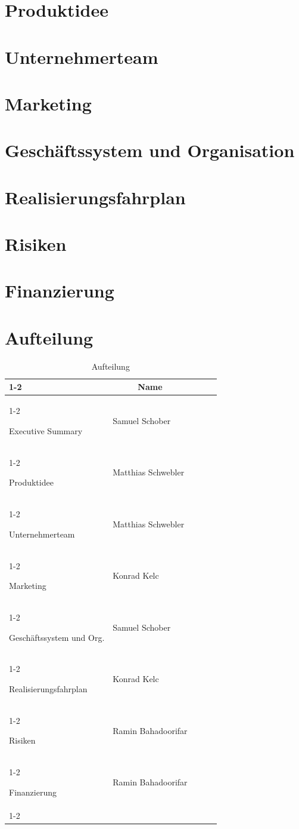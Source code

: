 \documentclass[11pt]{article}
\begin{document}
\section{Produktidee}
\section{Unternehmerteam}
\section{Marketing}
\section{Gesch\"aftssystem und Organisation}
\section{Realisierungsfahrplan}
\section{Risiken}
\section{Finanzierung}

\newpage
\section{Aufteilung}
\begin{table}[ht]
	\centering
	\begin{tabular}{|l|l|lll}
		\cline{1-2}
		\multicolumn{1}{|c|}{\textbf{\rule{0pt}{3ex} Thema}} & \multicolumn{1}{c|}{\textbf{Name}} &  &  &  \\ \cline{1-2}
		
		\rule{0pt}{3ex} Executive Summary                    & Samuel Schober                     &  &  &  \\ \cline{1-2}
		\rule{0pt}{3ex} Produktidee                          & Matthias Schwebler                 &  &  &  \\ \cline{1-2}
		\rule{0pt}{3ex} Unternehmerteam                      & Matthias Schwebler                 &  &  &  \\ \cline{1-2}
		\rule{0pt}{3ex} Marketing                            & Konrad Kelc                        &  &  &  \\ \cline{1-2}
		\rule{0pt}{3ex} Geschäftssystem und Org.             & Samuel Schober                     &  &  &  \\ \cline{1-2}
		\rule{0pt}{3ex} Realisierungsfahrplan                & Konrad Kelc                        &  &  &  \\ \cline{1-2}
		\rule{0pt}{3ex} Risiken                              & Ramin Bahadoorifar                 &  &  &  \\ \cline{1-2}
		\rule{0pt}{3ex} Finanzierung                         & Ramin Bahadoorifar                 &  &  &  \\ \cline{1-2}
	\end{tabular}
	\caption{Aufteilung}
\end{table}
\end{document}
